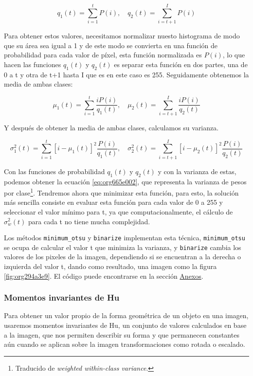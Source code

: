 \documentclass[letter]{article}
\begin{document}
$$ q_1(t) = \sum_{i=1}^t P(i), \quad q_2(t) = \sum_{i=t+1}^I P(i) $$

Para obtener estos valores, necesitamos normalizar nuesto histograma de modo que
su área sea igual a 1 y de este modo se convierta en una función de probabilidad
para cada valor de píxel, esta función normalizada es \(P(i)\), lo que hacen las
funciones \(q_1(t)\) y \(q_2(t)\) es separar esta función en dos partes, una de 0 a
t y otra de t+1 hasta I que es en este caso es 255. Seguidamente obtenemos la
media de ambas clases:

$$ \mu_1(t) = \sum_{i=1}^t \frac{i P(i)}{q_1(t)} , \quad \mu_2(t) = \sum_{i=t+1}^I \frac{i P(i)}{q_2(t)} $$

Y después de obtener la media de ambas clases, calculamos su varianza.

$$ \sigma_1^2(t) = \sum_{i=1}^t [i-\mu_1(t)]^2 \frac{P(i)}{q_1(t)} , \quad \sigma_2^2(t) = \sum_{i=t+1}^I [i-\mu_2(t)]^2 \frac{P(i)}{q_2(t)} $$

Con las funciones de probabilidad \(q_1(t)\) y \(q_2(t)\) y con la varianza de
estas, podemos obtener la ecuación \ref{eq:org665e002}, que representa la varianza de
pesos por clase\footnote{Traducido de \emph{weighted within-class variance}.}. Tendremos ahora que minimizar esta función,
para esto, la solución más sencilla consiste en evaluar esta función para cada
valor de 0 a 255 y seleccionar el valor mínimo para t, ya que
computacionalmente, el cálculo de \(\sigma_w^2(t)\) para cada t no tiene mucha
complejidad.

Los métodos \texttt{minimum\_otsu} y \texttt{binarize} implementan esta técnica, \texttt{minimum\_otsu}
se ocupa de calcular el valor t que minimiza la varianza, y \texttt{binarize} cambia
los valores de los pixeles de la imagen, dependiendo si se encuentran a la
derecha o izquierda del valor t, dando como resultado, una imagen como la figura
\ref{fig:org294a3e9}. El código puede encontrarse en la sección \hyperref[sec:orgdf60c56]{Anexos}.

\subsubsection{Momentos invariantes de Hu}
\label{sec:org44b811c}
Para obtener un valor propio de la forma geométrica de un objeto en una imagen,
usaremos momentos invariantes de Hu, un conjunto de valores calculados en base a
la imagen, que nos permiten describir su forma y que permanecen constantes aún
cuando se aplican sobre la imagen transformaciones como rotada o escalado.
\end{document}
